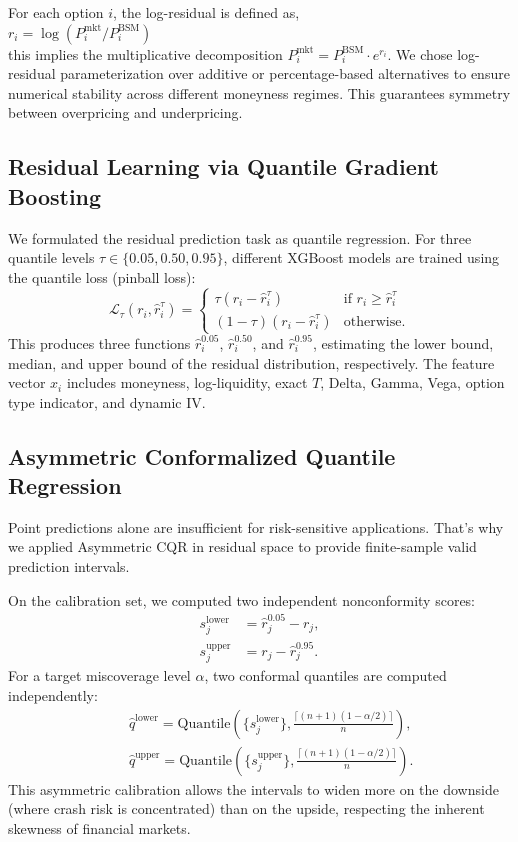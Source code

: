 \documentclass[runningheads]{llncs}
\newcommand{\rev}[1]{{\color{blue}#1}}
\begin{document}
For each option $i$, the log-residual is defined as, \\ $r_i = \log(P^{\text{mkt}}_i / P^{\text{BSM}}_i)$\\ this implies the multiplicative decomposition $P^{\text{mkt}}_i = P^{\text{BSM}}_i \cdot e^{r_i}$. We chose log-residual parameterization over additive or percentage-based alternatives to ensure numerical stability across different moneyness regimes. This guarantees symmetry between overpricing and underpricing.
\subsection{Residual Learning via Quantile Gradient Boosting}

\rev{We formulated the residual prediction task as quantile regression. For three quantile levels $\tau \in \{0.05, 0.50, 0.95\}$, different XGBoost models are trained using the quantile loss (pinball loss):
\begin{equation}
\mathcal{L}_\tau(r_i, \hat{r}_i^\tau) = \begin{cases} \tau (r_i - \hat{r}_i^\tau) & \text{if } r_i \geq \hat{r}_i^\tau \\ (1 - \tau)(r_i - \hat{r}_i^\tau) & \text{otherwise.} \end{cases}
\end{equation}
This produces three functions $\hat{r}_i^{0.05}$, $\hat{r}_i^{0.50}$, and $\hat{r}_i^{0.95}$, estimating the lower bound, median, and upper bound of the residual distribution, respectively.  The feature vector $x_i$ includes moneyness, log-liquidity, exact $T$, Delta, Gamma, Vega, option type indicator, and dynamic IV.}

\subsection{Asymmetric Conformalized Quantile Regression}

\rev{Point predictions alone are insufficient for risk-sensitive applications. That's why we applied Asymmetric CQR \cite{romano2019conformalized} in residual space to provide finite-sample valid prediction intervals.}

\rev{On the calibration set, we computed two independent nonconformity scores:
\begin{align}
s_j^{\text{lower}} &= \hat{r}_j^{0.05} - r_j, \\
s_j^{\text{upper}} &= r_j - \hat{r}_j^{0.95}.
\end{align}
For a target miscoverage level $\alpha$, two conformal quantiles are computed independently:
\begin{eqnarray}
&& \nonumber \hat{q}^{\text{lower}} = \text{Quantile}\left(\{s_j^{\text{lower}}\}, \frac{\lceil(n+1)(1-\alpha/2)\rceil}{n}\right),\\
&& \hat{q}^{\text{upper}} = \text{Quantile}\left(\{s_j^{\text{upper}}\}, \frac{\lceil(n+1)(1-\alpha/2)\rceil}{n}\right).
\end{eqnarray}
This asymmetric calibration allows the intervals to widen more on the downside (where crash risk is concentrated) than on the upside, respecting the inherent skewness of financial markets.}
\end{document}
